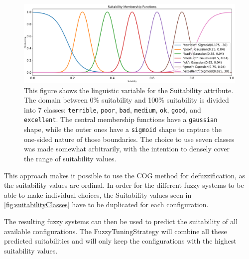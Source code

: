 \begin{figure}[H]
    \centering
    \includegraphics[width=\columnwidth,trim={0cm 0 0cm 0cm},clip]{figures/ProofOfConcepts/suitability_membership_functions.png}
    \caption[Linguistic variable for the Suitability attribute]{
        This figure shows the linguistic variable for the Suitability attribute. The domain between 0\% suitability and 100\% suitability is divided into 7 classes: \texttt{terrible}, \texttt{poor}, \texttt{bad}, \texttt{medium}, \texttt{ok}, \texttt{good}, and \texttt{excellent}. The central membership functions have a \texttt{gaussian} shape, while the outer ones have a \texttt{sigmoid} shape to capture the one-sided nature of those boundaries. The choice to use seven classes was made somewhat arbitrarily, with the intention to densely cover the range of suitability values.
    }
    \label{fig:suitabilityClasses}
\end{figure}

This approach makes it possible to use the COG method for defuzzification, as the suitability values are ordinal. In order for the different fuzzy systems to be able to make individual choices, the Suitability values seen in \autoref{fig:suitabilityClasses} have to be duplicated for each configuration.

The resulting fuzzy systems can then be used to predict the suitability of all available configurations. The FuzzyTuningStrategy will combine all these predicted suitabilities and will only keep the configurations with the highest suitability values.

\newpage



